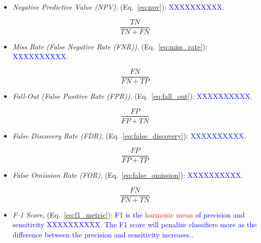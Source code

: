 \begin{itemize}
\item \textit{Negative Predictive Value (NPV)}, (Eq.~\ref{eq:npv}): \textcolor{blue}{XXXXXXXXXX}.

\begin{equation}
{\frac{TN}{TN+FN}}
\label{eq:npv}
\end{equation}

\item \textit{Miss Rate (False Negative Rate (FNR))}, (Eq.~\ref{eq:miss_rate}): \textcolor{blue}{XXXXXXXXXX}.

\begin{equation}
{\frac{FN}{FN+TP}}
\label{eq:miss_rate}
\end{equation}

\item \textit{Fall-Out (False Positive Rate (FPR))}, (Eq.~\ref{eq:fall_out}): \textcolor{blue}{XXXXXXXXXX}.

\begin{equation}
{\frac{FP}{FP+TN}}
\label{eq:fall_out}
\end{equation}

\item \textit{False Discovery Rate (FDR)}, (Eq.~\ref{eq:false_discovery}): \textcolor{blue}{XXXXXXXXXX}.

\begin{equation}
{\frac{FP}{FP+TP}}
\label{eq:false_discovery}
\end{equation}

\item \textit{False Omission Rate (FOR)}, (Eq.~\ref{eq:false_omission}): \textcolor{blue}{XXXXXXXXXX}.

\begin{equation}
{\frac{FN}{FN+TN}}
\label{eq:false_omission}
\end{equation}

\item \textit{F-1 Score}, (Eq.~\ref{eq:f1_metric}): \textcolor{blue}{F1 is the \textcolor{red}{harmonic mean} of precision and sensitivity XXXXXXXXXX. The F1 score will penalize classifiers more as the difference between the precision and sensitivity increases.}.


\end{itemize}
